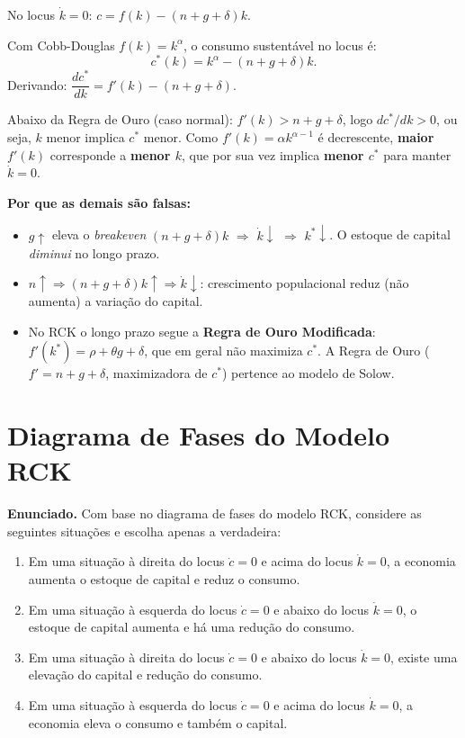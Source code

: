 \documentclass[12pt, a4paper]{article}
\begin{document}
\begin{correctbox}[title={Resposta correta: b)}]
No locus $\dot{k}=0$: $c = f(k) - (n+g+\delta)k$.

Com Cobb-Douglas $f(k)=k^\alpha$, o consumo sustentável no locus é:
\[
c^*(k) = k^\alpha - (n+g+\delta)k.
\]
Derivando: $\dfrac{dc^*}{dk} = f'(k) - (n+g+\delta)$.

Abaixo da Regra de Ouro (caso normal): $f'(k) > n+g+\delta$, logo $dc^*/dk > 0$, ou seja,
$k$ menor implica $c^*$ menor. Como $f'(k) = \alpha k^{\alpha-1}$ é decrescente,
\textbf{maior $f'(k)$} corresponde a \textbf{menor $k$}, que por sua vez implica
\textbf{menor $c^*$} para manter $\dot{k}=0$. \checkmark

\textbf{Por que as demais são falsas:}
\begin{itemize}[leftmargin=*]
\item[a)] $g\uparrow$ eleva o \textit{breakeven} $(n+g+\delta)k$ $\Rightarrow$ $\dot{k}\downarrow$ $\Rightarrow$
$k^*\downarrow$. O estoque de capital \emph{diminui} no longo prazo.
\item[c)] $n\uparrow \Rightarrow (n+g+\delta)k\uparrow \Rightarrow \dot{k}\downarrow$: crescimento
populacional reduz (não aumenta) a variação do capital.
\item[d)] No RCK o longo prazo segue a \textbf{Regra de Ouro Modificada}:
$f'(k^*)=\rho+\theta g+\delta$, que em geral não maximiza $c^*$. A Regra de Ouro
($f'=n+g+\delta$, maximizadora de $c^*$) pertence ao modelo de Solow.
\end{itemize}
\end{correctbox}

\section{Diagrama de Fases do Modelo RCK}

\textbf{Enunciado.} Com base no diagrama de fases do modelo RCK, considere as seguintes situações e escolha apenas a verdadeira:

\begin{enumerate}[label=\alph*)]
\item Em uma situação à direita do locus $\dot{c}=0$ e acima do locus $\dot{k}=0$,
a economia aumenta o estoque de capital e reduz o consumo.
\item Em uma situação à esquerda do locus $\dot{c}=0$ e abaixo do locus $\dot{k}=0$,
o estoque de capital aumenta e há uma redução do consumo.
\item Em uma situação à direita do locus $\dot{c}=0$ e abaixo do locus $\dot{k}=0$,
existe uma elevação do capital e redução do consumo.
\item Em uma situação à esquerda do locus $\dot{c}=0$ e acima do locus $\dot{k}=0$,
a economia eleva o consumo e também o capital.
\end{enumerate}
\end{document}
